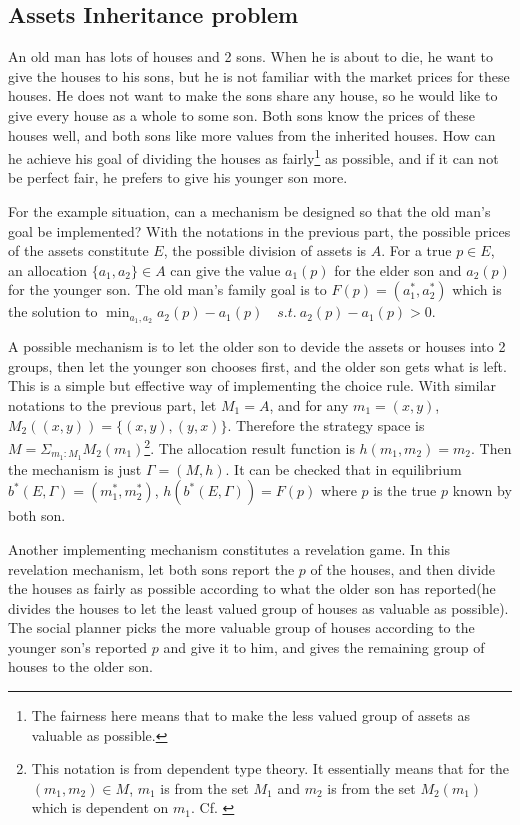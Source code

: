 \subsection{Assets Inheritance problem}
\label{assets_inheritance}
\begin{example}
An old man has lots of  houses and 2 sons. When he is about to die, he
want to give the houses to his sons, but he is not familiar with the
market prices for these houses. He does not want to make the sons
share any house, so he would like to  give every  house as a whole to some son. Both sons know the prices of these
houses well, and both  sons like more values from the
inherited houses. How can he achieve his goal of dividing the houses as
fairly\footnote{The fairness here means that to make the less valued group of assets as valuable as possible.} as possible, and if it can not be perfect fair, he prefers to
give his younger son more. 



\end{example} 

For the example situation, can a mechanism be designed so that the old
man's goal be implemented? With the notations in the previous part, the possible prices of the assets constitute $E$, the possible division of assets is $A$. For a true $p \in E$, an allocation $\{a_1,a_2\} \in A$ can give the value $a_1(p)$ for the elder son and $a_2(p)$ for the younger son. The old man's family goal is to $F(p)=(a_1^*,a_2^*)$ which is the solution to $\min_{a_1,a_2}a_2(p)-a_1(p)\quad s.t.\ a_2(p)-a_1(p)>0 $.

 A possible mechanism is to let the older son to devide the assets or houses into 2 groups, then let the younger son chooses first, and the older
son gets what is left. This is a simple but effective way of implementing the choice rule. With similar notations to the previous part, let $M_1= A$, and for any $m_1=(x,y)$, $M_2((x,y))=\{(x,y),(y,x)\}$. Therefore the strategy space is $M = \Sigma_{m_1:M_1}M_2(m_1)$\footnote{This notation is from dependent type theory. It essentially means that for the $(m_1,m_2)\in M$, $m_1$ is from the set $M_1$  and  $m_2$ is from the set $M_2(m_1)$ which is dependent on $m_1$. Cf. \parencite{Voevodsky} }. The allocation result function is $h(m_1,m_2)= m_2$. Then the mechanism is just $\Gamma = (M, h)$. It can be checked that in equilibrium $b^*(E,\Gamma)=(m_1^*,m_2^*)$, $h(b^*(E,\Gamma))=F(p)$ where $p$ is the true $p$ known by both son.

Another implementing mechanism constitutes a revelation game. In this revelation mechanism, let both sons report the $p$ of the houses, and then divide the houses as fairly as possible according to what the older son has reported(he divides the houses to let the least valued group of houses as valuable as possible). The social planner picks the more valuable group of houses according to the younger son's reported $p$ and 
give it to him,  and gives the remaining group of houses to  the older son. 

